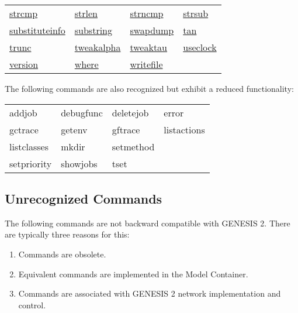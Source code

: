 \documentclass[12pt]{article}
\begin{document}
\begin{tabular}{l l l l}
\href{http://genesis-sim.org/GENESIS/Hyperdoc/Manual-25.html#ss25.181}{strcmp}                & \href{http://genesis-sim.org/GENESIS/Hyperdoc/Manual-25.html#ss25.182}{strlen}                     & \href{http://genesis-sim.org/GENESIS/Hyperdoc/Manual-25.html#ss25.183}{strncmp}    & \href{http://genesis-sim.org/GENESIS/Hyperdoc/Manual-25.html#ss25.184}{strsub} 		\\
\href{http://genesis-sim.org/GENESIS/Hyperdoc/Manual-25.html#ss25.185}{substituteinfo}    & \href{http://genesis-sim.org/GENESIS/Hyperdoc/Manual-25.html#ss25.186}{substring}              & \href{http://genesis-sim.org/GENESIS/Hyperdoc/Manual-25.html#ss25.187}{swapdump}& \href{http://genesis-sim.org/GENESIS/Hyperdoc/Manual-25.html#ss25.190}{tan} 	\\
\href{http://genesis-sim.org/GENESIS/Hyperdoc/Manual-25.html#ss25.191}{trunc}                   & \href{http://genesis-sim.org/GENESIS/Hyperdoc/Manual-25.html#ss25.192}{tweakalpha}         & \href{http://genesis-sim.org/GENESIS/Hyperdoc/Manual-25.html#ss25.193}{tweaktau}    & \href{http://genesis-sim.org/GENESIS/Hyperdoc/Manual-25.html#ss25.194}{useclock} \\
\href{http://genesis-sim.org/GENESIS/Hyperdoc/Manual-25.html#ss25.195}{version}              & \href{http://genesis-sim.org/GENESIS/Hyperdoc/Manual-25.html#ss25.201}{where}                    & \href{http://genesis-sim.org/GENESIS/Hyperdoc/Manual-25.html#ss25.203}{writefile}      &   \\
\end{tabular}

The following commands are also recognized but exhibit a reduced functionality:

\begin{tabular}{l l l l}
addjob 		& debugfunc 	& deletejob 	& error				\\
gctrace 		& getenv 		& gftrace 		& listactions			\\
listclasses		& mkdir 		& setmethod	& 	\\
setpriority		& showjobs 	& tset		&  					\\
\end{tabular}
 
\subsection*{Unrecognized Commands}

The following commands are not backward compatible with GENESIS 2. There are typically three reasons for this:
\begin{enumerate}
\item Commands are obsolete.
\item Equivalent commands are implemented in the Model Container.
\item Commands are associated with GENESIS 2 network implementation and control. 
\end{enumerate}
\end{document}
